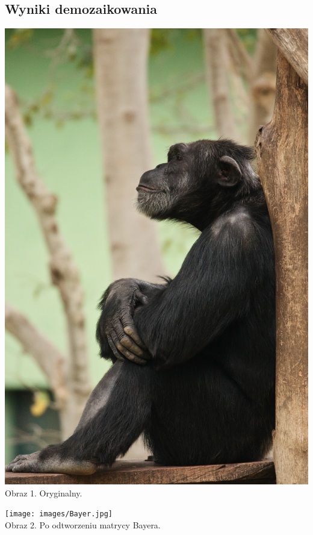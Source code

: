 \documentclass[14pt]{article}
\begin{document}
\subsection{Wyniki demozaikowania}
\vspace{1cm}
\begin{center}
    \includegraphics[scale=0.2]{images/Fella.jpg}
    \\ \small Obraz 1. Oryginalny.

    \vspace{0.5cm}
    \texttt{[image: images/Bayer.jpg]}
    \\ \small Obraz 2. Po odtworzeniu matrycy Bayera.


\end{center}
\end{document}
